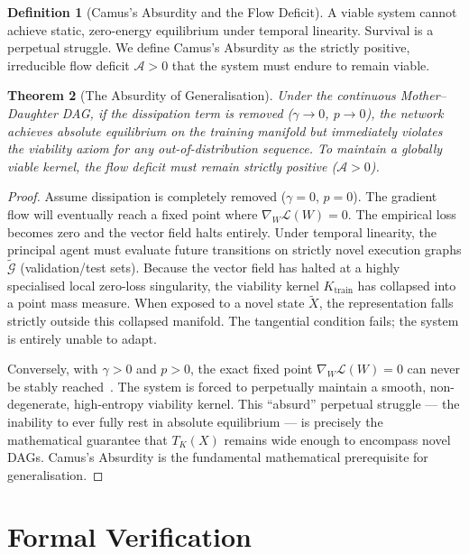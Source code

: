 \documentclass[11pt,a4paper]{article}
\newtheorem{theorem}{Theorem}[section]
\theoremstyle{definition}
\newtheorem{definition}[theorem]{Definition}
\theoremstyle{remark}
\begin{document}
\begin{definition}[Camus's Absurdity and the Flow Deficit]\label{def:absurdity}
A viable system cannot achieve static, zero-energy equilibrium under temporal linearity. Survival is a perpetual struggle. We define Camus's Absurdity as the strictly positive, irreducible flow deficit $\mathcal{A} > 0$ that the system must endure to remain viable.
\end{definition}

\begin{theorem}[The Absurdity of Generalisation]\label{thm:absurdity}
Under the continuous Mother--Daughter DAG, if the dissipation term is removed ($\gamma \to 0$, $p \to 0$), the network achieves absolute equilibrium on the training manifold but immediately violates the viability axiom for any out-of-distribution sequence. To maintain a globally viable kernel, the flow deficit must remain strictly positive ($\mathcal{A} > 0$).
\end{theorem}

\begin{proof}
Assume dissipation is completely removed ($\gamma = 0$, $p = 0$). The gradient flow will eventually reach a fixed point where $\nabla_W \mathcal{L}(W) = 0$. The empirical loss becomes zero and the vector field halts entirely. Under temporal linearity, the principal agent must evaluate future transitions on strictly novel execution graphs $\tilde{\mathcal{G}}$ (validation/test sets). Because the vector field has halted at a highly specialised local zero-loss singularity, the viability kernel $K_{\mathrm{train}}$ has collapsed into a point mass measure. When exposed to a novel state $\tilde{X}$, the representation falls strictly outside this collapsed manifold. The tangential condition fails; the system is entirely unable to adapt.

Conversely, with $\gamma > 0$ and $p > 0$, the exact fixed point $\nabla_W \mathcal{L}(W) = 0$ can never be stably reached~\cite{srivastava2014,zhang2021}. The system is forced to perpetually maintain a smooth, non-degenerate, high-entropy viability kernel. This ``absurd'' perpetual struggle --- the inability to ever fully rest in absolute equilibrium --- is precisely the mathematical guarantee that $T_K(X)$ remains wide enough to encompass novel DAGs. Camus's Absurdity is the fundamental mathematical prerequisite for generalisation.
\end{proof}


\section{Formal Verification}
\end{document}
